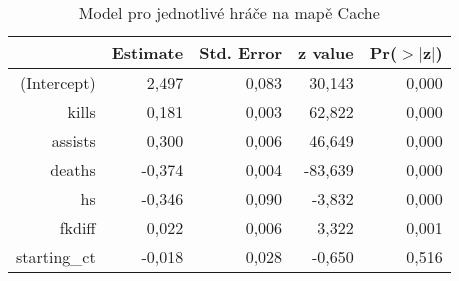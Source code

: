 \begin{table}[H]
\centering
\begin{tabular}{rrrrr}
  \hline
 & Estimate & Std. Error & z value & Pr($>$$|$z$|$) \\ 
  \hline
(Intercept) & 2,497 & 0,083 & 30,143 & 0,000 \\ 
  kills & 0,181 & 0,003 & 62,822 & 0,000 \\ 
  assists & 0,300 & 0,006 & 46,649 & 0,000 \\ 
  deaths & -0,374 & 0,004 & -83,639 & 0,000 \\ 
  hs & -0,346 & 0,090 & -3,832 & 0,000 \\ 
  fkdiff & 0,022 & 0,006 & 3,322 & 0,001 \\ 
  starting\_ct & -0,018 & 0,028 & -0,650 & 0,516 \\ 
   \hline
\end{tabular}
\caption{\label{tab:player_model_Cache}Model pro jednotlivé hráče na mapě Cache} 
\end{table}
